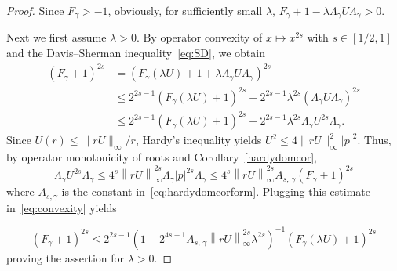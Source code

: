 \documentclass[AHL,Unicode,longabstracts,published]{cedram}
\begin{document}
\begin{proof}
Since $F_\gamma>-1$, obviously, for sufficiently small $\lambda$, $F_{\gamma}+1 -\lambda \Lambda_\gamma U \Lambda_\gamma>0$.

Next we first assume $\lambda>0$. By operator convexity of $x\mapsto x^{2s}$ with $s\in[1/2,1]$ and the Davis--Sherman inequality~\eqref{eq:SD}, we obtain
\begin{equation}\label{eq:convexity}
\begin{split}
\left(F_\gamma+1\right)^{2s} &= \left(F_{\gamma}(\lambda U)+1 + \lambda \Lambda_\gamma U\Lambda_\gamma \right)^{2s}\\
&\leq 2^{2s-1}\left(F_{\gamma}(\lambda U)+1 \right)^{2s}
+ 2^{2s-1}\lambda^{2s}\left(\Lambda_\gamma U\Lambda_\gamma \right)^{2s}\\
&\leq 2^{2s-1}\left(F_{\gamma}(\lambda U)+1 \right)^{2s} + 2^{2s-1}\lambda^{2s}\Lambda_\gamma U^{2s}\Lambda_\gamma.
\end{split}
\end{equation}
Since $U(r)\leq \|rU\|_\infty/r$, Hardy's inequality yields $ U^2 \leq 4\|rU\|_\infty^2|p|^2$. Thus, by operator monotonicity of roots and Corollary~\ref{hardydomcor},
\[
\Lambda_\gamma U^{2s}\Lambda_\gamma \leq 4^s\left\|rU\right\|_\infty^{2s}\Lambda_\gamma |p|^{2s}\Lambda_\gamma
\leq 4^s\left\|rU\right\|_\infty^{2s}A_{s,\,\gamma}\left(F_\gamma+1\right)^{2s}
\]
where $A_{s,\gamma}$ is the constant in~\eqref{eq:hardydomcorform}. Plugging this estimate in~\eqref{eq:convexity} yields

\[
\left(F_\gamma+1\right)^{2s} \leq 2^{2s-1}\left(1-2^{4s-1}A_{s,\,\gamma}\left\|rU\right\|_\infty^{2s}\lambda^{2s}\right)^{-1}
\left(F_{\gamma}(\lambda U)+1\right)^{2s}
\]
proving the assertion for $\lambda>0$.


\end{proof}
\end{document}
